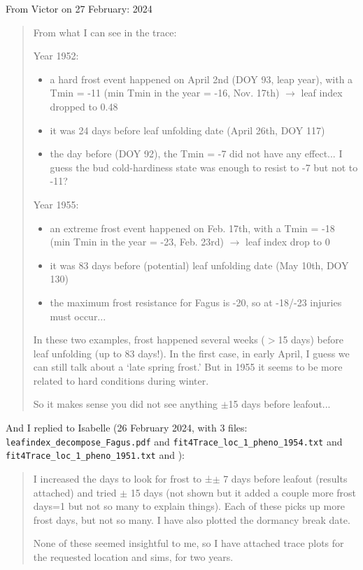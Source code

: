 \documentclass[11pt,letter]{article}
\begin{document}
From Victor on 27 February: 2024
\begin{quote}
From what I can see in the trace:

Year 1952:
\begin{itemize}
\item a hard frost event happened on April 2nd (DOY 93, leap year), with a Tmin = -11 (min Tmin in the year = -16, Nov. 17th) $\rightarrow$ leaf index dropped to 0.48
\item it was 24 days before leaf unfolding date (April 26th, DOY 117)
\item the day before (DOY 92), the Tmin = -7 did not have any effect... I guess the bud cold-hardiness state was enough to resist to -7 but not to -11?
\end{itemize}

Year 1955:
\begin{itemize}
\item an extreme frost event happened on Feb. 17th, with a Tmin = -18 (min Tmin in the year = -23, Feb. 23rd) $\rightarrow$ leaf index drop to 0
\item it was 83 days before (potential) leaf unfolding date (May 10th, DOY 130)
\item the maximum frost resistance for Fagus is -20, so at -18/-23 injuries must occur... 
\end{itemize}

In these two examples, frost happened several weeks ($>$15 days) before leaf unfolding (up to 83 days!).
In the first case, in early April, I guess we can still talk about a `late spring frost.' 
But in 1955 it seems to be more related to hard conditions during winter. 

So it makes sense you did not see anything $\pm$15 days before leafout...
\end{quote}

And I replied to Isabelle (26 February 2024, with 3 files: \verb|leafindex_decompose_Fagus.pdf| and \verb|fit4Trace_loc_1_pheno_1954.txt| and \verb|fit4Trace_loc_1_pheno_1951.txt| and ):
\begin{quote}
I increased the days to look for frost to ±$\pm$ 7 days before leafout 
(results attached) and tried $\pm$ 15 days (not shown but it added a couple 
more frost days=1 but not so many to explain things). Each of these 
picks up more frost days, but not so many. I have also plotted the 
dormancy break date.

None of these seemed insightful to me, so I have attached trace plots 
for the requested location and sims, for two years.
\end{quote}
\end{document}
